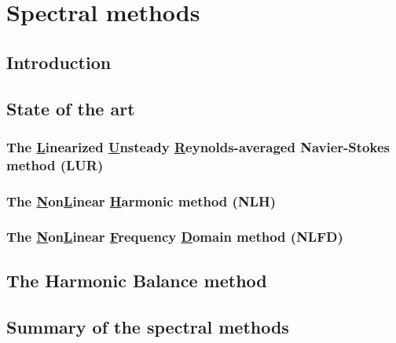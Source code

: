 \chapter{Spectral methods}
\label{cha:spectral_methods}

\chabstract{}

\section{Introduction}
\label{sec:sm_intro}


\section{State of the art}
\label{sec:sm_state_of_the_art}


\subsection{The \underline{L}inearized 
\underline{U}nsteady \underline{R}eynolds-averaged Navier-Stokes method (LUR)}
\label{sub:sm_lur}


\subsection{The \underline{N}on\underline{L}inear 
\underline{H}armonic method (NLH)}
\label{sub:sm_nlh}


\subsection{The \underline{N}on\underline{L}inear 
\underline{F}requency \underline{D}omain method (NLFD)}
\label{sub:sm_nlfd}


\section{The Harmonic Balance method}
\label{sec:sm_hb}


\section{Summary of the spectral methods}
\label{sec:sm_summary}


